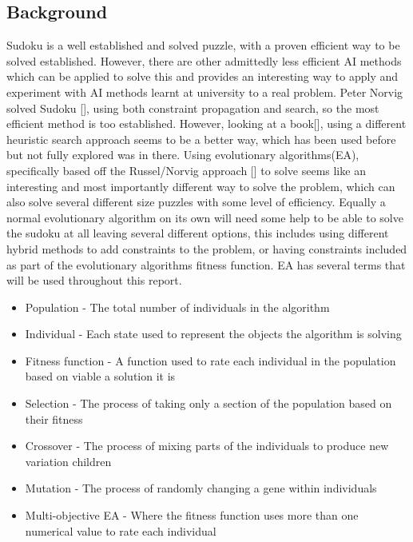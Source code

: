 \documentclass[a4paper,11pt]{article}
\begin{document}
\subsection{Background}
Sudoku is a well established and solved puzzle, with a proven efficient way to be solved established. However, there are other admittedly less efficient AI methods which can be applied to solve this and provides an interesting way to apply and experiment with AI methods learnt at university to a real problem.\newline \newline
Peter Norvig solved Sudoku [], using both constraint propagation and search, so the most efficient method is too established. However, looking at a book[], using a different heuristic search approach seems to be a better way, which has been used before but not fully explored was in there. \newline \newline
Using evolutionary algorithms(EA), specifically based off the Russel/Norvig approach [] to solve seems like an interesting and most importantly different way to solve the problem, which can also solve several different size puzzles with some level of efficiency. Equally a normal evolutionary algorithm on its own will need some help to be able to solve the sudoku at all leaving several different options, this includes using different hybrid methods to add constraints to the problem, or having constraints included as part of the evolutionary algorithms fitness function.\newline\newline
EA has several terms that will be used throughout this report.\\
\begin{itemize}
	\item Population - The total number of individuals in the algorithm
	\item Individual - Each state used to represent the objects the algorithm is solving
	\item Fitness function - A function used to rate each individual in the population based on viable a solution it is
	\item Selection - The process of taking only a section of the population based on their fitness
	\item Crossover - The process of mixing parts of the individuals to produce new variation children 
	\item Mutation -  The process of randomly changing a gene within individuals
	\item Multi-objective EA - Where the fitness function uses more than one numerical value to rate each individual
\end{itemize}
\end{document}
